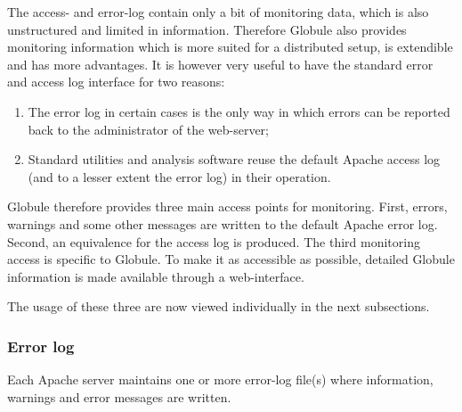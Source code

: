 \documentclass[10pt,a4paper]{article}
\makeatletter
\newenvironment{p}{\@open{P}{}}{\@close{P}}
\newenvironment{p}{}{\par}
\makeatother
\begin{document}
\begin{p}
The access- and error-log contain only a bit of monitoring data, which is also
unstructured and limited in information.  Therefore Globule also provides
monitoring information which is more suited for a distributed setup, is
extendible and has more advantages.  It is however very useful to have the
standard error and access log interface for two reasons:
\end{p}

\begin{p}
\begin{enumerate}
\item The error log in certain cases is the only way in which errors can be
reported back to the administrator of the web-server;
\item Standard utilities and analysis software reuse the default Apache access
log (and to a lesser extent the error log) in their operation.
\end{enumerate}
\end{p}

\begin{p}
Globule therefore provides three main access points for monitoring.  First,
errors, warnings and some other messages are written to the default Apache
error log.  Second, an equivalence for the access log is produced.  The third
monitoring access is specific to Globule.  To make it as accessible as
possible, detailed Globule information is made available through a
web-interface.
\end{p}

\begin{p}
The usage of these three are now viewed individually in the next subsections.
\end{p}

\subsubsection{Error log}

\begin{p}
Each Apache server maintains one or more error-log file(s) where information,
warnings and error messages are written.
\end{p}
\end{document}
